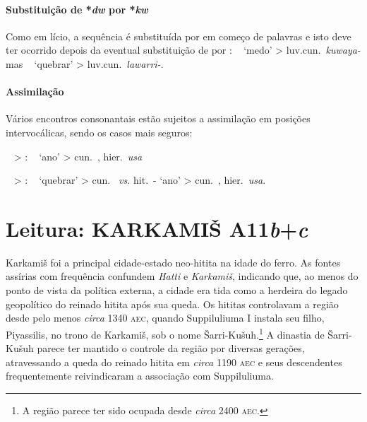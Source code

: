 \paragraph{Substituição de *\emph{dw} por *\emph{kw}}
Como em lício, a sequência  é substituída por
 em começo de palavras e isto deve ter ocorrido depois da
eventual substituição de  por :
\pac~ `medo' > luv.cun.\ \emph{kuwaya-} mas
\pac~ `quebrar' > luv.cun.\ \emph{lawarri-}.

\paragraph{Assimilação} Vários encontros consonantais estão sujeitos
a assimilação em posições intervocálicas, sendo os casos mais seguros:
\begin{compactitem}
	\item  \pac~ > : \pac~
	`ano' > cun.\ \emph{}, hier.\ \emph{usa}
	\item  \pac~ > :
	\pac~
	`quebrar' > cun.\ \emph{} \emph{vs.}
	hit.\ \emph{}-
	`ano' > cun.\ \emph{}, hier.\ \emph{usa}.
\end{compactitem}

\clearpage

\section{Leitura: KARKAMIŠ A11\emph{b}+\emph{c}}
Karkamiš foi a principal cidade-estado neo-hitita na idade do ferro.
As fontes assírias com frequência confundem \emph{Hatti} e \emph{Karkamiš},
indicando que, ao menos do ponto de vista da política externa, a cidade era tida
como a herdeira do legado geopolítico do reinado hitita após sua queda.
Os hititas controlavam a região desde pelo menos \emph{circa} 1340 \textsc{aec},
quando Suppiluliuma I instala seu filho, Piyassilis, no trono de Karkamiš, sob o
nome Šarri-Kušuh.\footnote{A região parece ter sido ocupada desde \emph{circa}
	2400 \textsc{aec}.}
A dinastia de Šarri-Kušuh parece ter mantido o controle da região por diversas
gerações, atravessando a queda do reinado hitita em \emph{circa} 1190
\textsc{aec} e seus descendentes frequentemente reivindicaram a associação com
Suppiluliuma.

